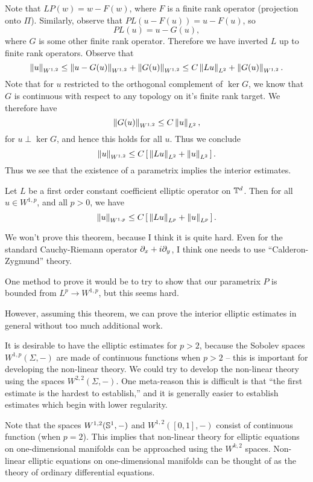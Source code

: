   Note that $LP(w)=w-F(w)$, where $F$ is a finite rank operator (projection onto $\Pi$). Similarly, observe that $PL(u-F(u))=u-F(u)$, so
  \begin{equation*}
    PL(u)=u-G(u),
  \end{equation*}
  where $G$ is some other finite rank operator. Therefore we have inverted $L$ up to finite rank operators. Observe that
  \begin{equation*}
    \norm{u}_{W^{1,2}}\le \norm{u-G(u)}_{W^{1,2}}+\norm{G(u)}_{W^{1,2}}\le C\norm{Lu}_{L^{2}}+\norm{G(u)}_{W^{1,2}}.
  \end{equation*}
  Note that for $u$ restricted to the orthogonal complement of $\ker G$, we know that $G$ is continuous with respect to any topology on it's finite rank target. We therefore have
  \begin{equation*}
    \norm{G(u)}_{W^{1,2}}\le C\norm{u}_{L^{2}},
  \end{equation*}
  for $u\perp \ker G$, and hence this holds for all $u$. Thus we conclude
  \begin{equation*}
    \norm{u}_{W^{1,2}}\le C\left[\,\norm{Lu}_{L^{2}}+\norm{u}_{L^{2}}\,\right].
  \end{equation*}
  Thus we see that the existence of a parametrix implies the interior estimates.         
\begin{thm}
  Let $L$ be a first order constant coefficient elliptic operator on $\T^{d}$. Then for all $u\in W^{1,p}$, and all $p>0$, we have
  \begin{equation*}
    \norm{u}_{W^{1,p}}\le C\left[\,\norm{Lu}_{L^{p}}+\norm{u}_{L^{p}}\,\right].
  \end{equation*}  
\end{thm}
\begin{remark}
  We won't prove this theorem, because I think it is quite hard. Even for the standard Cauchy-Riemann operator $\bd_{x}+i\bd_{y}$, I think one needs to use ``Calderon-Zygmund'' theory.

  One method to prove it would be to try to show that our parametrix $P$ is bounded from $L^{p}\to W^{1,p}$, but this seems hard.

  However, assuming this theorem, we can prove the interior elliptic estimates in general without too much additional work.

  It is desirable to have the elliptic estimates for $p>2$, because the Sobolev spaces $W^{1,p}(\Sigma,-)$ are made of continuous functions when $p>2$ -- this is important for developing the non-linear theory. We could try to develop the non-linear theory using the spaces $W^{2,2}(\Sigma,-)$. One meta-reason this is difficult is that ``the first estimate is the hardest to establish,'' and it is generally easier to establish estimates which begin with lower regularity.

  Note that the spaces $W^{1,2}(\S^{1},-)$ and $W^{1,2}([0,1],-)$ consist of continuous function (when $p=2$). This implies that non-linear theory for elliptic equations on one-dimensional manifolds can be approached using the $W^{k,2}$ spaces. Non-linear elliptic equations on one-dimensional manifolds can be thought of as the theory of ordinary differential equations.
\end{remark}
